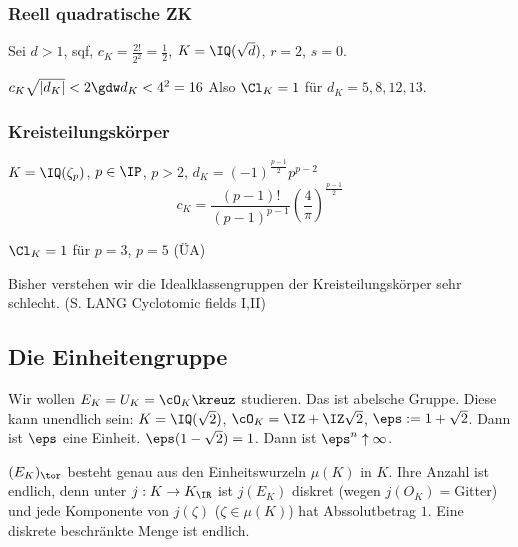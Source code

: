 \renewcommand{\lecdate}{26.11.2014}

\subsubsection{Reell quadratische ZK}

Sei $d>1$, sqf, $c_K=\frac{2!}{2^2}=\frac{1}{2}$, $K=\IQ(\sqrt{d})$, $r=2$, $s=0$.

$c_K\sqrt{|d_K|}<2 \gdw d_K<4^2=16$ Also $\Cl_K=1$ für $d_K=5,8,12,13$.

\subsubsection{Kreisteilungskörper}

$K=\IQ(\zeta_p)$, $p\in\IP$, $p>2$, $d_K=(-1)^{\frac{p-1}{2}}p^{p-2}$
\[ c_K=\frac{(p-1)!}{(p-1)^{p-1}}\left(\frac{4}{\pi} \right)^{\frac{p-1}{2}}\]

$\Cl_K=1$ für $p=3$, $p=5$ (ÜA)

Bisher verstehen wir die Idealklassengruppen der Kreisteilungskörper sehr schlecht. (S. LANG Cyclotomic fields I,II)

\subsection{Die Einheitengruppe}%

Wir wollen $E_K=U_K=\cO_K\kreuz$ studieren. Das ist abelsche Gruppe. Diese kann unendlich sein: $K=\IQ(\sqrt{2})$, $\cO_K=\IZ+\IZ\sqrt 2$, $\eps:=1+\sqrt 2$. Dann ist $\eps$ eine Einheit. $\eps(1-\sqrt 2)=1$.
Dann ist $\eps^n\uparrow\infty$.

\begin{Bemerkung} $(E_K)_{\tor}$ besteht genau aus den Einheitswurzeln $\mu(K)$ in $K$. Ihre Anzahl ist endlich, denn unter $j:K\rightarrow K_{\IR}$ ist $j(E_K)$ diskret (wegen $j(O_K)=$Gitter) und jede Komponente von $j(\zeta)$ ($\zeta\in\mu(K)$) hat Abssolutbetrag $1$. Eine diskrete beschränkte Menge ist endlich. 
\end{Bemerkung}

